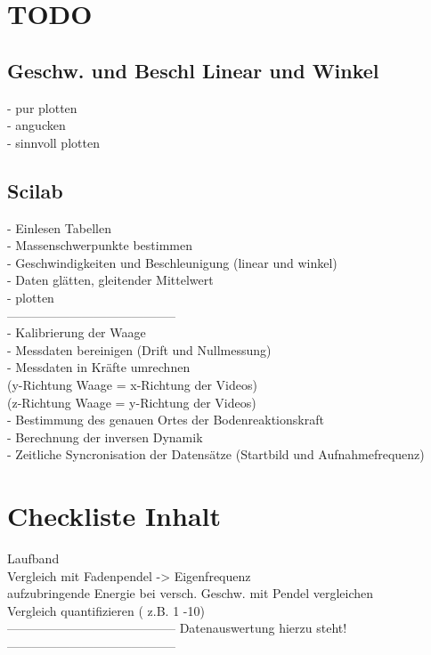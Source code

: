 \section{TODO}
\subsection{Geschw. und Beschl Linear und Winkel}
- pur plotten\\
- angucken\\
- sinnvoll plotten\\
\subsection{Scilab}
- Einlesen Tabellen\\
- Massenschwerpunkte bestimmen\\
- Geschwindigkeiten und Beschleunigung (linear und winkel)\\
- Daten glätten, gleitender Mittelwert\\
- plotten\\
-----------------------------------------\\
- Kalibrierung der Waage\\
- Messdaten bereinigen (Drift und Nullmessung)\\
- Messdaten in Kräfte umrechnen\\
(y-Richtung Waage = x-Richtung der Videos)\\
(z-Richtung Waage = y-Richtung der Videos)\\
- Bestimmung des genauen Ortes der Bodenreaktionskraft\\
- Berechnung der inversen Dynamik\\
- Zeitliche Syncronisation der Datensätze (Startbild und Aufnahmefrequenz)\\
\clearpage

\section{Checkliste Inhalt}
Laufband\\
Vergleich mit Fadenpendel -> Eigenfrequenz\\
aufzubringende Energie bei versch. Geschw. mit Pendel vergleichen\\
Vergleich quantifizieren ( z.B. 1 -10)\\
-----------------------------------------
Datenauswertung hierzu steht!
-----------------------------------------\\\\

